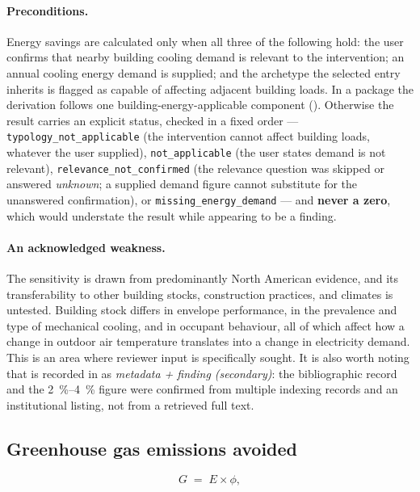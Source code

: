 \paragraph{Preconditions.} Energy savings are calculated only when all three of
the following hold: the user confirms that nearby building cooling demand is
relevant to the intervention; an annual cooling energy demand is supplied; and
the archetype the selected entry inherits is flagged as capable of affecting
adjacent building loads. In a package the derivation follows one
building-energy-applicable component ().
Otherwise the result carries an explicit status, checked in a fixed order ---
\texttt{typology\_not\_applicable} (the intervention cannot affect building
loads, whatever the user supplied), \texttt{not\_applicable} (the user states
demand is not relevant), \texttt{relevance\_not\_confirmed} (the relevance
question was skipped or answered \emph{unknown}; a supplied demand figure
cannot substitute for the unanswered confirmation), or
\texttt{missing\_energy\_demand} --- and \textbf{never a zero}, which would
understate the result while appearing to be a finding.

\paragraph{An acknowledged weakness.} The sensitivity is drawn from
predominantly North American evidence, and its transferability to other
building stocks, construction practices, and climates is untested. Building
stock differs in envelope performance, in the prevalence and type of mechanical
cooling, and in occupant behaviour, all of which affect how a change in outdoor
air temperature translates into a change in electricity demand. This is an area
where reviewer input is specifically sought. It is also worth noting that
\textcite{akbari2001} is recorded in  as
\emph{metadata + finding (secondary)}: the bibliographic record and the
\SIrange{2}{4}{\percent} figure were confirmed from multiple indexing records
and an institutional listing, not from a retrieved full text.

\subsection{Greenhouse gas emissions avoided}
\label{sec:ghg}

\begin{equation}
\label{eq:ghg}
G \;=\; E \times \phi,
\end{equation}


